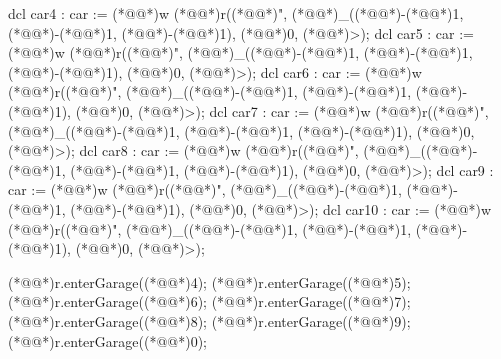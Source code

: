 \documentclass[a4paper]{article}
\begin{document}
\begin{vdm_al}
        dcl car4 : car := (*@@*)w (*@@*)r((*@@*)", (*@@*)_((*@\vdmnotcovered{}@*)-(*@\vdmnotcovered{}@*)1, (*@\vdmnotcovered{}@*)-(*@\vdmnotcovered{}@*)1, (*@\vdmnotcovered{}@*)-(*@\vdmnotcovered{}@*)1), (*@\vdmnotcovered{}@*)0, (*@@*)>);
        dcl car5 : car := (*@@*)w (*@@*)r((*@@*)", (*@@*)_((*@\vdmnotcovered{}@*)-(*@\vdmnotcovered{}@*)1, (*@\vdmnotcovered{}@*)-(*@\vdmnotcovered{}@*)1, (*@\vdmnotcovered{}@*)-(*@\vdmnotcovered{}@*)1), (*@\vdmnotcovered{}@*)0, (*@@*)>);
        dcl car6 : car := (*@@*)w (*@@*)r((*@@*)", (*@@*)_((*@\vdmnotcovered{}@*)-(*@\vdmnotcovered{}@*)1, (*@\vdmnotcovered{}@*)-(*@\vdmnotcovered{}@*)1, (*@\vdmnotcovered{}@*)-(*@\vdmnotcovered{}@*)1), (*@\vdmnotcovered{}@*)0, (*@@*)>);
        dcl car7 : car := (*@@*)w (*@@*)r((*@@*)", (*@@*)_((*@\vdmnotcovered{}@*)-(*@\vdmnotcovered{}@*)1, (*@\vdmnotcovered{}@*)-(*@\vdmnotcovered{}@*)1, (*@\vdmnotcovered{}@*)-(*@\vdmnotcovered{}@*)1), (*@\vdmnotcovered{}@*)0, (*@@*)>);
        dcl car8 : car := (*@@*)w (*@@*)r((*@@*)", (*@@*)_((*@\vdmnotcovered{}@*)-(*@\vdmnotcovered{}@*)1, (*@\vdmnotcovered{}@*)-(*@\vdmnotcovered{}@*)1, (*@\vdmnotcovered{}@*)-(*@\vdmnotcovered{}@*)1), (*@\vdmnotcovered{}@*)0, (*@@*)>);
        dcl car9 : car := (*@@*)w (*@@*)r((*@@*)", (*@@*)_((*@\vdmnotcovered{}@*)-(*@\vdmnotcovered{}@*)1, (*@\vdmnotcovered{}@*)-(*@\vdmnotcovered{}@*)1, (*@\vdmnotcovered{}@*)-(*@\vdmnotcovered{}@*)1), (*@\vdmnotcovered{}@*)0, (*@@*)>);
        dcl car10 : car := (*@@*)w (*@@*)r((*@@*)", (*@@*)_((*@\vdmnotcovered{}@*)-(*@\vdmnotcovered{}@*)1, (*@\vdmnotcovered{}@*)-(*@\vdmnotcovered{}@*)1, (*@\vdmnotcovered{}@*)-(*@\vdmnotcovered{}@*)1), (*@\vdmnotcovered{}@*)0, (*@@*)>);
        
        
        
        
        (*@@*)r.enterGarage((*@@*)4);
        (*@@*)r.enterGarage((*@@*)5);
        (*@@*)r.enterGarage((*@@*)6);
        (*@@*)r.enterGarage((*@@*)7);
        (*@@*)r.enterGarage((*@@*)8);
        (*@@*)r.enterGarage((*@@*)9);
        (*@@*)r.enterGarage((*@@*)0);
    

\end{vdm_al}
\end{document}
